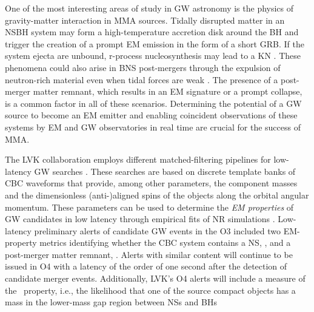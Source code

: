 One of the most interesting areas of study in \ac{GW} astronomy is the physics of gravity-matter interaction in \ac{MMA} sources. Tidally disrupted matter in an
\ac{NSBH} system may form a high-temperature accretion disk around the \ac{BH} and trigger the creation of a prompt \ac{EM} emission in the form of a short \ac{GRB}. If
the system ejecta are unbound, r-process nucleosynthesis may lead to a \ac{KN} \cite{Lattimer:1974slx, Li:1998bw, Korobkin:2012uy, Barnes:2013wka, Tanaka:2013ana,
Kasen:2014toa}. These phenomena could also arise in \ac{BNS} post-mergers through the expulsion of neutron-rich material even when tidal forces are weak
\cite{LIGOScientific:2017ync, Arcavi:2017xiz, Coulter:2017wya, Kasliwal:2017ngb, Lipunov:2017dwd, DES:2017kbs, Tanvir:2017pws}. The presence of a post-merger matter
remnant, which results in an \ac{EM} signature or a prompt collapse, is a common factor in all of these scenarios. Determining the potential of a \ac{GW} source to
become an \ac{EM} emitter and enabling coincident observations of these systems by \ac{EM} and \ac{GW} observatories in real time are crucial for the success of
\ac{MMA}.

The \ac{LVK} collaboration employs different matched-filtering pipelines for low-latency \ac{GW} searches \cite{Sachdev:2020lfd,Nitz_2018,Adams_2016} . These searches are based on discrete template banks of \ac{CBC} waveforms that provide, among other parameters, the component masses and the
dimensionless (anti-)aligned spins of the objects along the orbital angular momentum. These parameters can be used to determine the \emph{\ac{EM} properties} of
\ac{GW} candidates in low latency through empirical fits of \ac{NR} simulations \cite{Foucart:2012nc,Foucart:2018rjc}. Low-latency preliminary alerts of candidate
\ac{GW} events in the \ac{O3} included two \ac{EM}-property metrics identifying whether the \ac{CBC} system contains a \ac{NS}, \hasns, and a post-merger matter
remnant, \hasrem. Alerts with similar content will continue to be issued in \ac{O4} with a latency of the order of one second after the detection of candidate merger events.  Additionally, \ac{LVK}'s \ac{O4} alerts will include a measure of the \hasgap\ property, i.e., the likelihood that one of the source compact objects has a mass in the lower-mass gap region between \ac{NS}s and \ac{BH}s


